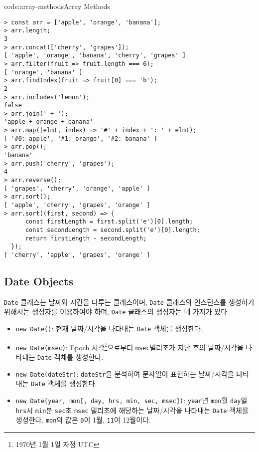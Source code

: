 \begin{codeenv}{code:array-methods}{Array Methods}\begin{verbatim}
> const arr = ['apple', 'orange', 'banana'];
> arr.length;
3
> arr.concat(['cherry', 'grapes']);
[ 'apple', 'orange', 'banana', 'cherry', 'grapes' ]
> arr.filter(fruit => fruit.length === 6);
[ 'orange', 'banana' ]
> arr.findIndex(fruit => fruit[0] === 'b');
2
> arr.includes('lemon');
false
> arr.join(' + ');
'apple + orange + banana'
> arr.map((elmt, index) => '#' + index + ': ' + elmt);
[ '#0: apple', '#1: orange', '#2: banana' ]
> arr.pop();
'banana'
> arr.push('cherry', 'grapes');
4
> arr.reverse();
[ 'grapes', 'cherry', 'orange', 'apple' ]
> arr.sort();
[ 'apple', 'cherry', 'grapes', 'orange' ]
> arr.sort((first, second) => {
      const firstLength = first.split('e')[0].length;
      const secondLength = second.split('e')[0].length;
      return firstLength - secondLength;
  });
[ 'cherry', 'apple', 'grapes', 'orange' ]
\end{verbatim}
\end{codeenv}
\newpage

\subsection*{Date Objects}

\texttt{Date} 클래스는 날짜와 시간을 다루는 클래스이며, \texttt{Date} 클래스의 인스턴스를 생성하기 위해서는 생성자를 이용하여야 하며, \texttt{Date} 클래스의 생성자는 네 가지가 있다.

\begin{itemize}
    \item \texttt{new Date()}: 현재 날짜/시각을 나타내는 \texttt{Date} 객체를 생성한다.
    \item \texttt{new Date(msec)}: Epoch 시각\footnote{1970년 1월 1일 자정 UTC}으로부터 \texttt{msec}밀리초가 지난 후의 날짜/시각을 나타내는 \texttt{Date} 객체를 생성한다.
    \item \texttt{new Date(dateStr)}: \texttt{dateStr}을 분석하여 문자열이 표현하는 날짜/시각을 나타내는 \texttt{Date} 객체를 생성한다.
    \item \texttt{new Date(year, mon[, day, hrs, min, sec, msec])}: \texttt{year}년 \texttt{mon}월 \texttt{day}일 \texttt{hrs}시 \texttt{min}분 \texttt{sec}초 \texttt{msec} 밀리초에 해당하는 날짜/시각을 나타내는 \texttt{Date} 객체를 생성한다. \texttt{mon}의 값은 \texttt{0}이 1월, \texttt{11}이 12월이다.
\end{itemize}

